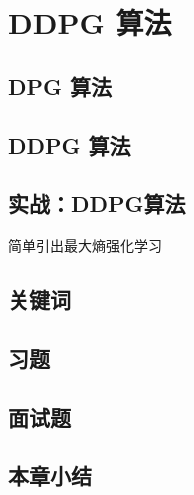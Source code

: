 
\section{ DDPG 算法}
\subsection{ DPG 算法}
\subsection{ DDPG 算法}
\subsection{实战：DDPG算法}

简单引出最大熵强化学习

\subsection{关键词}
\subsection{习题}
\subsection{面试题}
\subsection{本章小结}